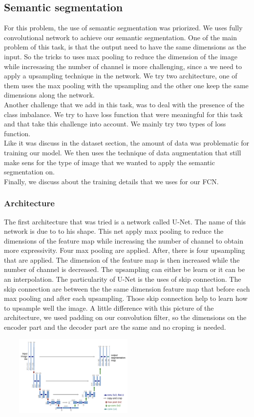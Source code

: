 \subsection{Semantic segmentation}
For this problem, the use of semantic segmentation was priorized. We uses fully convolutional network to achieve our semantic segmentation. One of the main problem of this task, is that the output need to have the same dimensions as the input. So the tricks to uses max pooling to reduce the dimension of the image while incresasing the number of channel is more challenging, since a we need to apply a upsampling technique in the network. We try two architecture, one of them uses the max pooling with the upsampling and the other one keep the same dimensions along the network. 
\\
Another challenge that we add in this task, was to deal with the presence of the class imbalance. We try to have loss function that were meaningful for this task and that take this challenge into account. We mainly try two types of loss function.
\\
Like it was discuss in the dataset section, the amount of data was problematic for training our model. We then uses the technique of data augmentation that still make sens for the type of image that we wanted to apply the semantic segmentation on.
\\
Finally, we discuss about the training details that we uses for our FCN.

\subsubsection{Architecture}
The first architecture that was tried is a network called U-Net. The name of this network is due to to his shape. This net apply max pooling to reduce the dimensions of the feature map while increasing the number of channel to obtain more expressivity. Four max pooling are applied. After, there is four upsampling that are applied. The dimension of the feature map is then increased while the number of channel is decreased. The upsampling can either be learn or it can be an interpolation. The particularity of U-Net is the uses of skip connection. The skip connection are between the the same dimension feature map that before each max pooling and after each upsampling. Those skip connection help to learn how to upsample well the image. A little difference with this picture of the architecture, we used padding on our convolution filter, so the dimensions on the encoder part and the decoder part are the same and no croping is needed.
\begin{center}
	\includegraphics[width=7.5cm,height=4cm]{figures/unet-architecture.png}
\end{center}

